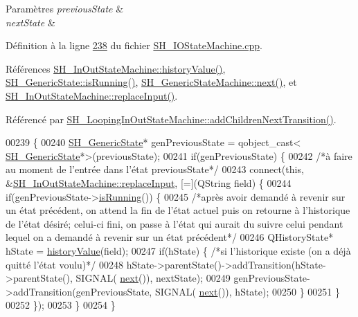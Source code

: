 \begin{DoxyParams}{Paramètres}
{\em previous\-State} & \\
\hline
{\em next\-State} & \\
\hline
\end{DoxyParams}


Définition à la ligne \hyperlink{SH__IOStateMachine_8cpp_source_l00238}{238} du fichier \hyperlink{SH__IOStateMachine_8cpp_source}{S\-H\-\_\-\-I\-O\-State\-Machine.\-cpp}.



Références \hyperlink{classSH__InOutStateMachine_af71bfdb3b59b7bf2763588b513b4205f}{S\-H\-\_\-\-In\-Out\-State\-Machine\-::history\-Value()}, \hyperlink{classSH__GenericState_a5f731810dad0cacd28828ccbf1539e4e}{S\-H\-\_\-\-Generic\-State\-::is\-Running()}, \hyperlink{classSH__GenericStateMachine_af4771d31d87951c997fba1633c2d67f6}{S\-H\-\_\-\-Generic\-State\-Machine\-::next()}, et \hyperlink{classSH__InOutStateMachine_a9fa5db44086de2576c812f631aa4f60a}{S\-H\-\_\-\-In\-Out\-State\-Machine\-::replace\-Input()}.



Référencé par \hyperlink{classSH__LoopingInOutStateMachine_abfae9f47019379f270496de46845c729}{S\-H\-\_\-\-Looping\-In\-Out\-State\-Machine\-::add\-Children\-Next\-Transition()}.


\begin{DoxyCode}
00239 \{
00240         \hyperlink{classSH__GenericState}{SH\_GenericState}* genPreviousState = qobject\_cast<
      \hyperlink{classSH__GenericState}{SH\_GenericState}*>(previousState);
00241     \textcolor{keywordflow}{if}(genPreviousState) \{
00242         \textcolor{comment}{/*à faire au moment de l'entrée dans l'état previousState*/}
00243         connect(\textcolor{keyword}{this}, &\hyperlink{classSH__InOutStateMachine_a9fa5db44086de2576c812f631aa4f60a}{SH\_InOutStateMachine::replaceInput}, [=](QString 
      field) \{
00244             \textcolor{keywordflow}{if}(genPreviousState->\hyperlink{classSH__GenericState_a5f731810dad0cacd28828ccbf1539e4e}{isRunning}()) \{
00245                 \textcolor{comment}{/*après avoir demandé à revenir sur un état précédent, on attend la fin de l'état actuel
       puis on retourne à l'historique de l'état désiré; celui-ci fini, on passe à l'état qui aurait du suivre celui
       pendant lequel on a demandé à revenir sur un état précédent*/}
00246                 QHistoryState* hState = \hyperlink{classSH__InOutStateMachine_af71bfdb3b59b7bf2763588b513b4205f}{historyValue}(field);
00247                 \textcolor{keywordflow}{if}(hState) \{ \textcolor{comment}{/*si l'historique existe (on a déjà quitté l'état voulu)*/}
00248                     hState->parentState()->addTransition(hState->parentState(), SIGNAL(
      \hyperlink{classSH__GenericStateMachine_af4771d31d87951c997fba1633c2d67f6}{next}()), nextState);
00249                     genPreviousState->addTransition(genPreviousState, SIGNAL(
      \hyperlink{classSH__GenericStateMachine_af4771d31d87951c997fba1633c2d67f6}{next}()), hState);
00250                 \}
00251             \}
00252         \});
00253     \}
00254 \}
\end{DoxyCode}


